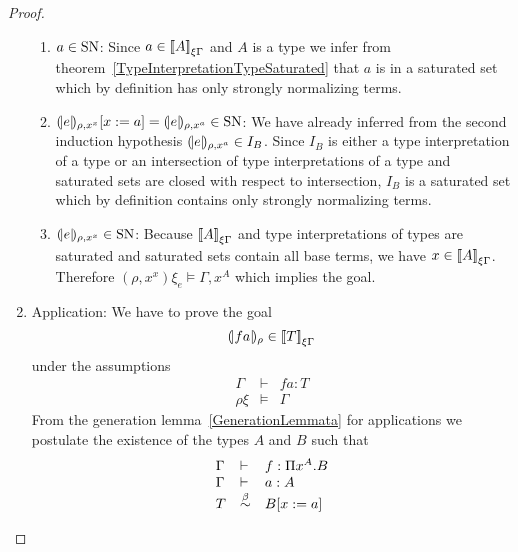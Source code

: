 \begin{theorem}
\begin{proof}
\begin{enumerate}
\begin{enumerate}
            \item $a \in \text{SN}$: Since $a \in {{{[\![}A {]\!]}}_{\xi\Gamma}}$ and $A$ is
                a type we infer from
                theorem~\ref{TypeInterpretationTypeSaturated} that $a$ is in
                a saturated set which by definition has only strongly
                normalizing terms.

            \item
                ${(\!|e|\!)_{\rho,x^x}}[x:=a]
                = {(\!|e|\!)_{\rho,x^a}}
                \in \text{SN}$:
                We have already inferred from the second induction
                hypothesis ${(\!|e|\!)_{\rho,x^a}} \in I_B$. Since $I_B$
                is either a type interpretation of a type or an intersection
                of type interpretations of a type and saturated sets are
                closed with respect to intersection, $I_B$ is a saturated
                set which by definition contains only strongly normalizing
                terms.

            \item ${(\!|e|\!)_{\rho,x^x}} \in \text{SN}$: Because
                ${{{[\![} A {]\!]}}_{\xi\Gamma}}$ and type interpretations of types are
                    saturated and saturated sets contain all base terms, we have
                    $x \in {{{[\![}A {]\!]}}_{\xi\Gamma}}$. Therefore $(\rho,x^x)\xi_e
                    \vDash \Gamma,x^A$ which implies the goal.
            \end{enumerate}


        \item Application: We have to prove the goal
            $$
            {(\!|f a|\!)_{\rho}} \in {{{[\![}T {]\!]}}_{\xi\Gamma}}
            $$
            under the assumptions
            $$
            \begin{array}{lll}
                \Gamma &\vdash& f a : T
                \\
                \rho\xi &\vDash& \Gamma
            \end{array}
            $$
            From the generation lemma~\ref{GenerationLemmata} for applications
            we postulate the existence of the types $A$ and $B$ such that
            $$
            \begin{array}{lll}
                \Gamma &\vdash& f : \Pi x^A.B
                \\
                \Gamma &\vdash& a : A
                \\
                T &\stackrel{\beta}{\sim}& B[x:=a]
            \end{array}
            $$


\end{enumerate}
\end{proof}
\end{theorem}

